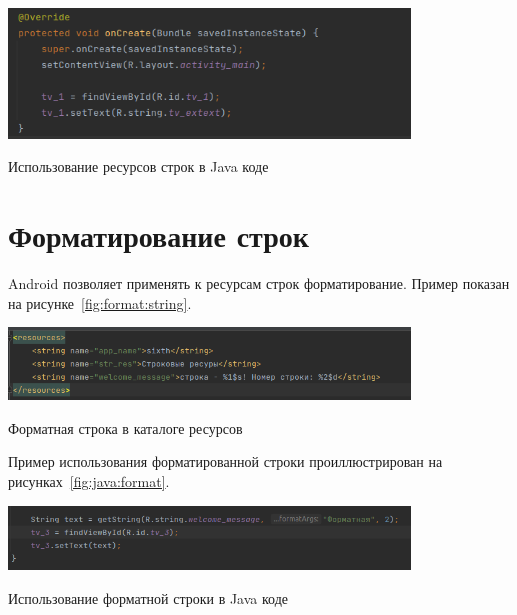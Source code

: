 \begin{image}
	\includegraphics[width=0.8\textwidth]{Screenshot from 2023-03-28 15-30-24.png}
	\caption{Использование ресурсов строк в Java коде}
	\label{fig:java:string}
\end{image}

\section{Форматирование строк}
Android позволяет применять к ресурсам строк форматирование. Пример
показан на рисунке~\ref{fig:format:string}.

\begin{image}
	\includegraphics[width=0.8\textwidth]{Screenshot from 2023-03-28 15-40-34.png}
	\caption{Форматная строка в каталоге ресурсов}
	\label{fig:format:string}
\end{image}

Пример использования форматированной строки проиллюстрирован
на рисунках~\ref{fig:java:format}.
\begin{image}
	\includegraphics[width=0.8\textwidth]{Screenshot from 2023-03-28 15-44-46.png}
	\caption{Использование форматной строки в Java коде}
	\label{fig:java:format}
\end{image}

\section{}
\section{}
\section{}
